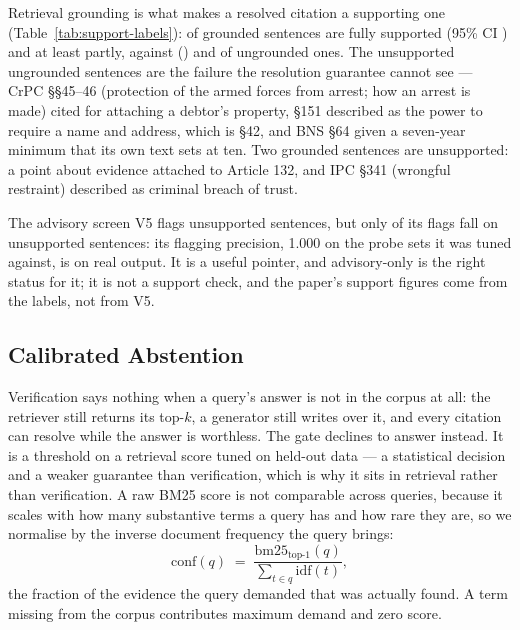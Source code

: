 \documentclass[conference]{IEEEtran}
\begin{document}
Retrieval grounding is what makes a resolved citation a supporting one (Table~\ref{tab:support-labels}): \SupGroundedPrec{} of grounded sentences are fully supported (95\% CI \SupGroundedCI) and \SupGroundedOrPartial{} at least partly, against \SupUngroundedPrec{} (\SupUngroundedCI) and \SupUngroundedOrPartial{} of ungrounded ones. The \SupUngroundedUnsup{} unsupported ungrounded sentences are the failure the resolution guarantee cannot see --- CrPC \S\S45--46 (protection of the armed forces from arrest; how an arrest is made) cited for attaching a debtor's property, \S151 described as the power to require a name and address, which is \S42, and BNS \S64 given a seven-year minimum that its own text sets at ten. Two grounded sentences are unsupported: a point about evidence attached to Article 132, and IPC \S341 (wrongful restraint) described as criminal breach of trust.

The advisory screen V5 flags \SupVfiveCaught{} unsupported sentences, but only \SupVfiveTrue{} of its \SupVfiveFlagged{} flags fall on unsupported sentences: its flagging precision, 1.000 on the probe sets it was tuned against, is \SupVfiveFlagPrec{} on real output. It is a useful pointer, and advisory-only is the right status for it; it is not a support check, and the paper's support figures come from the labels, not from V5.

\subsection{Calibrated Abstention}
\label{ssec:gate}

Verification says nothing when a query's answer is not in the corpus at all: the retriever still returns its top-$k$, a generator still writes over it, and every citation can resolve while the answer is worthless. The gate declines to answer instead. It is a threshold on a retrieval score tuned on held-out data --- a statistical decision and a weaker guarantee than verification, which is why it sits in retrieval rather than verification. A raw BM25 score is not comparable across queries, because it scales with how many substantive terms a query has and how rare they are, so we normalise by the inverse document frequency the query brings:
\[
\mathrm{conf}(q) \;=\; \frac{\mathrm{bm25}_{\text{top-1}}(q)}{\sum_{t \in q} \mathrm{idf}(t)},
\]
the fraction of the evidence the query demanded that was actually found. A term missing from the corpus contributes maximum demand and zero score.
\end{document}
